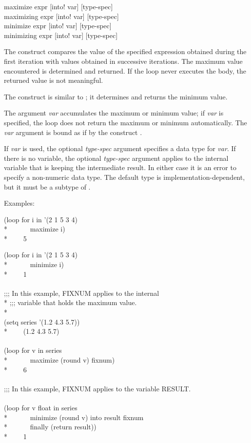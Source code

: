 \begin{defloop}
maximize expr [\!into! var] [type-spec] \\
maximizing expr [\!into! var] [type-spec] \\
minimize expr [\!into! var] [type-spec] \\
minimizing expr [\!into! var] [type-spec]

The  construct compares the value of the specified expression
obtained during the first iteration with values obtained in successive
iterations. The maximum value encountered is determined and returned.  If the
loop never executes the body, the returned value is not meaningful.

The  construct is similar to ; it
determines and returns the minimum value.

The argument \emph{var\/} accumulates the maximum or
minimum value; if \emph{var} is specified, the loop
does not return the maximum or minimum automatically.  The \emph{var\/} argument
is bound as if by the construct .

If  \emph{var\/} is used, the optional
\emph{type-spec\/} argument specifies a data type for \emph{var\/}.
If there is no  variable, the optional \emph{type-spec\/}
argument applies to the internal variable that is keeping the intermediate result.
In either case it is an error to specify a non-numeric 
data type.
The default type is implementation-dependent, but it must be a subtype
of .

Examples:
\begin{lisp}
(loop for i in '(2 1 5 3 4) \\*
~~~~~~maximize i) \\*
~~~\EV~5
\end{lisp}
\begin{lisp}
(loop for i in '(2 1 5 3 4) \\*
~~~~~~minimize i) \\*
~~~\EV~1 \\
 \\
;;; In this example, FIXNUM applies to the internal \\*
;;; variable that holds the maximum value. \\*
\\
(setq series '(1.2 4.3 5.7)) \\*
~~~\EV~(1.2 4.3 5.7) \\
\\
(loop for v in series  \\*
~~~~~~maximize (round v) fixnum) \\*
~~~\EV~6 \\
 \\
;;; In this example, FIXNUM applies to the variable RESULT. \\
\\
(loop for v float in series \\*
~~~~~~minimize (round v) into result fixnum \\*
~~~~~~finally (return result)) \\*
~~~\EV~1
\end{lisp}
\end{defloop}


